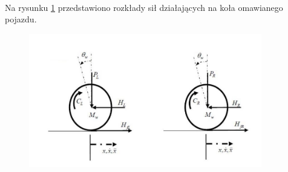 \paragraph*{}
Na rysunku \ref{fig:model_kola} przedstawiono rozkłady sił działających na koła omawianego pojazdu.

\begin{figure}[h]
	\centering
	\includegraphics[width=4in]{Figures/model_kola.jpg}
	\label{fig:model_kola}
\end{figure}


